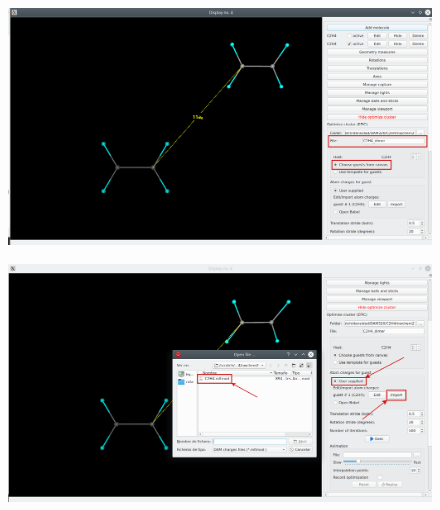 \documentclass[a4paper,10pt]{article}
\begin{document}
\begin{minipage}{.5\linewidth}
\begin{figure}[H]
\caption{\label{fig:51}}
\begin{center}
\includegraphics[width=0.95\linewidth]{damqt_QS_fig51_b.png}
\end{center}
\end{figure} 
\end{minipage}
\begin{minipage}{.5\linewidth}
\begin{figure}[H]
\caption{\label{fig:52}}
\begin{center}
\includegraphics[width=0.95\linewidth]{damqt_QS_fig52_b.png}
\end{center}
\end{figure} 
\end{minipage}
\end{document}
